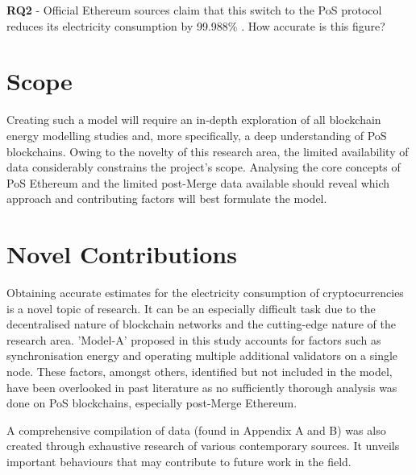 \textbf{RQ2} - Official Ethereum sources claim that this switch to the PoS protocol reduces its electricity consumption by 99.988\% \cite{EthereumEthereum.orgc}. How accurate is this figure?

\section{Scope}
Creating such a model will require an in-depth exploration of all blockchain energy modelling studies and, more specifically, a deep understanding of PoS blockchains. Owing to the novelty of this research area, the limited availability of data considerably constrains the project's scope. Analysing the core concepts of PoS Ethereum and the limited post-Merge data available should reveal which approach and contributing factors will best formulate the model.  

\section{Novel Contributions}
Obtaining accurate estimates for the electricity consumption of cryptocurrencies is a novel topic of research. It can be an especially difficult task due to the decentralised nature of blockchain networks and the cutting-edge nature of the research area. 'Model-A' proposed in this study accounts for factors such as synchronisation energy and operating multiple additional validators on a single node. These factors, amongst others, identified but not included in the model, have been overlooked in past literature as no sufficiently thorough analysis was done on PoS blockchains, especially post-Merge Ethereum.

A comprehensive compilation of data (found in Appendix A and B) was also created through exhaustive research of various contemporary sources. It unveils important behaviours that may contribute to future work in the field.
